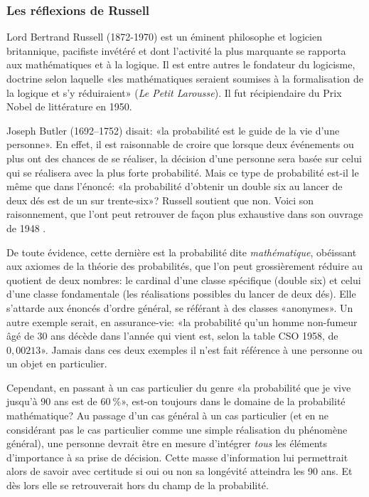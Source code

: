 \subsubsection{Les réflexions de Russell}

Lord Bertrand Russell (1872-1970) est un éminent philosophe et
logicien britannique, pacifiste invétéré et dont l'activité la plus
marquante se rapporta aux mathématiques et à la logique. Il est entre
autres le fondateur du logicisme, doctrine selon laquelle «les
mathématiques seraient soumises à la formalisation de la logique et
s'y réduiraient» (\emph{Le Petit Larousse}). Il fut récipiendaire du
Prix Nobel de littérature en 1950.

Joseph Butler (1692--1752) disait: «la probabilité est le guide de la
vie d'une personne».  En effet, il est raisonnable de croire que
lorsque deux événements ou plus ont des chances de se réaliser, la
décision d'une personne sera basée sur celui qui se réalisera avec la
plus forte probabilité. Mais ce type de probabilité est-il le même que
dans l'énoncé: «la probabilité d'obtenir un double six au lancer de
deux dés est de un sur trente-six»? Russell soutient que non. Voici
son raisonnement, que l'ont peut retrouver de façon plus exhaustive
dans son ouvrage de 1948 \citep{Russell:human:1948}.

De toute évidence, cette dernière est la probabilité dite
\emph{mathématique}, obéissant aux axiomes de la théorie des
probabilités, que l'on peut grossièrement réduire au quotient de deux
nombres: le cardinal d'une classe spécifique (double six) et celui
d'une classe fondamentale (les réalisations possibles du lancer de
deux dés). Elle s'attarde aux énoncés d'ordre général, se référant à
des classes «anonymes». Un autre exemple serait, en assurance-vie: «la
probabilité qu'un homme non-fumeur âgé de 30 ans décède dans l'année
qui vient est, selon la table CSO 1958, de $0,00213$». Jamais dans ces
deux exemples il n'est fait référence à une personne ou un objet en
particulier.

Cependant, en passant à un cas particulier du genre «la probabilité
que je vive jusqu'à 90 ans est de $60~\%$», est-on toujours dans le
domaine de la probabilité mathématique? Au passage d'un cas général à
un cas particulier (et en ne considérant pas le cas particulier comme
une simple réalisation du phénomène général), une personne devrait
être en mesure d'intégrer \emph{tous} les éléments d'importance à sa
prise de décision. Cette masse d'information lui permettrait alors de
savoir avec certitude si oui ou non sa longévité atteindra les 90 ans.
Et dès lors elle se retrouverait hors du champ de la probabilité.

